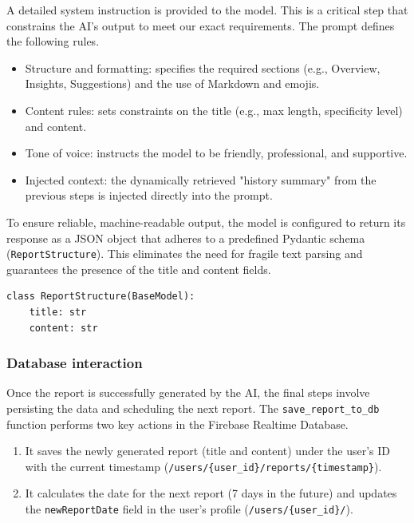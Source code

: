 \documentclass{article}
\begin{document}
A detailed system instruction is provided to the model.
This is a critical step that constrains the AI’s output to meet our exact requirements.
The prompt defines the following rules.

\begin{itemize}
	\item Structure and formatting: specifies the required sections (e.g., Overview, Insights, Suggestions) and the use of Markdown and emojis.
	\item Content rules: sets constraints on the title (e.g., max length, specificity level) and content.
	\item Tone of voice: instructs the model to be friendly, professional, and supportive.
	\item Injected context: the dynamically retrieved "history summary" from the previous steps is injected directly into the prompt.
\end{itemize}

To ensure reliable, machine-readable output, the model is configured to return its response as a JSON object that adheres to a predefined Pydantic schema (\verb|ReportStructure|).
This eliminates the need for fragile text parsing and guarantees the presence of the title and content fields.

\begin{verbatim}
class ReportStructure(BaseModel):
    title: str
    content: str
\end{verbatim}

\subsubsection{Database interaction}

Once the report is successfully generated by the AI, the final steps involve persisting the data and scheduling the next report.
The \verb|save_report_to_db| function performs two key actions in the Firebase Realtime Database.

\begin{enumerate}
	\item It saves the newly generated report (title and content) under the user’s ID with the current timestamp (\verb|/users/{user_id}/reports/{timestamp}|).
	\item It calculates the date for the next report (7 days in the future) and updates the \verb|newReportDate| field in the user’s profile (\verb|/users/{user_id}/|).
\end{enumerate}
\end{document}
